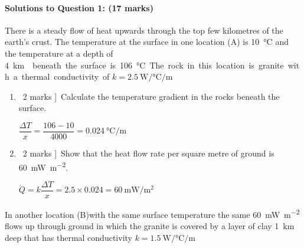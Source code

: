 \documentclass[a4paper,12pt,fleqn]{article}
\begin{document}
\paragraph{\textbf{Solutions to Question 1: (17 marks)}}
There is a steady flow of heat upwards through the top few kilometres of the earth's crust.  The temperature at the surface in one location (A) is \SI{10}{\celsius} and the temperature at a depth of \SI{4}\km{} beneath the surface is \SI{106}{\celsius}. The rock in this location is granite with a thermal conductivity of $k=\SI{2.5}{\watt\per\celsius\per\metre}$
\begin{enumerate}[label=\alph*)]
\item \lbrack\ 2 marks ]\ Calculate the temperature gradient in the rocks beneath the surface.\par
$\dfrac{\Delta T}{x}=\dfrac{106-10}{4000}=\SI{0.024}{\celsius\per\metre}$
\item \lbrack\ 2 marks ]\ Show that the heat flow rate per square metre of ground is \SI{60}{\milli\watt\per\metre\squared}.\par
$\dot Q=k\dfrac{\Delta T}{x}=2.5\times 0.024 = \SI{60}{\milli\watt\per\metre\squared}$
\end{enumerate}
In another location (B)with the same surface temperature the same \SI{60}{\milli\watt\per\metre\squared} flows up through ground in which the granite is covered by a layer of clay \SI{1}{\kilo\metre} deep that has thermal conductivity $k=\SI{1.5}{\watt\per\celsius\per\metre}$
\end{document}
